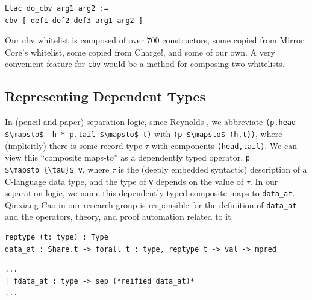 \documentclass{puthesis}
\begin{document}
\begin{lstlisting}
Ltac do_cbv arg1 arg2 :=
cbv [ def1 def2 def3 arg1 arg2 ]
\end{lstlisting}

Our cbv whitelist is composed of over 700 constructors, some
copied from Mirror Core's whitelist, some copied from Charge!, and
some of our own. A very convenient feature for \lstinline|cbv| would
be a method for composing two whitelists.

\subsection{Representing Dependent Types}
\label{sub:dependent}


In (pencil-and-paper) separation logic, since Reynolds
\cite{reynolds02}, we abbreviate 
\lstinline|(p.head $\mapsto$  h * p.tail $\mapsto$ t)| with 
\lstinline|(p $\mapsto$ (h,t))|, where (implicitly) there is some record type $\tau$ with
components \lstinline|(head,tail)|.  We can view this ``composite maps-to'' as a
dependently typed operator, \lstinline|p $\mapsto_{\tau}$ v|, where $\tau$ is the (deeply
embedded syntactic) description of a C-language data type, and the
type of \lstinline|v| depends on the value of $\tau$.  In our separation logic, we
name this dependently typed composite maps-to
\lstinline|data_at|. Qinxiang Cao in our research group is responsible
for the definition of \lstinline|data_at| and the operators, theory, and proof automation related to it.

\begin{lstlisting}
reptype (t: type) : Type
data_at : Share.t -> forall t : type, reptype t -> val -> mpred
\end{lstlisting}
\begin{lstlisting}
...
| fdata_at : type -> sep (*reified data_at)*
...
\end{lstlisting}
\end{document}
